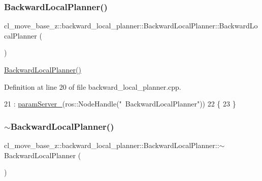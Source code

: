 \subsubsection{\texorpdfstring{Backward\+Local\+Planner()}{BackwardLocalPlanner()}}
{\footnotesize\ttfamily cl\+\_\+move\+\_\+base\+\_\+z\+::backward\+\_\+local\+\_\+planner\+::\+Backward\+Local\+Planner\+::\+Backward\+Local\+Planner (\begin{DoxyParamCaption}{ }\end{DoxyParamCaption})}

\hyperlink{classcl__move__base__z_1_1backward__local__planner_1_1BackwardLocalPlanner_a79e73a858b2a13c7fe10c52e08568fd6}{Backward\+Local\+Planner()} 

Definition at line 20 of file backward\+\_\+local\+\_\+planner.\+cpp.


\begin{DoxyCode}
21             : \hyperlink{classcl__move__base__z_1_1backward__local__planner_1_1BackwardLocalPlanner_afb349461ce9c4edee018dbb822a8cd9a}{paramServer\_}(ros::NodeHandle(\textcolor{stringliteral}{"~BackwardLocalPlanner"}))
22         \{
23         \}
\end{DoxyCode}
\mbox{\label{classcl__move__base__z_1_1backward__local__planner_1_1BackwardLocalPlanner_a6a36aa94617786c6958e861e64abb862}} 
\subsubsection{\texorpdfstring{$\sim$\+Backward\+Local\+Planner()}{~BackwardLocalPlanner()}}
{\footnotesize\ttfamily cl\+\_\+move\+\_\+base\+\_\+z\+::backward\+\_\+local\+\_\+planner\+::\+Backward\+Local\+Planner\+::$\sim$\+Backward\+Local\+Planner (\begin{DoxyParamCaption}{ }\end{DoxyParamCaption})\hspace{0.3cm}{\ttfamily [virtual]}}

